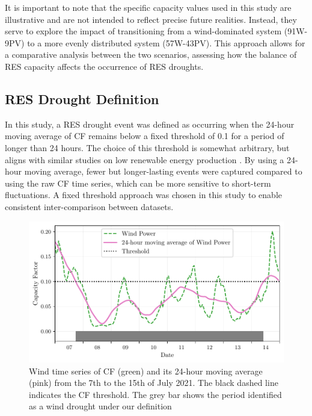 \documentclass[a4paper, 11p1t]{article}
\begin{document}
It is important to note that the specific capacity values used in this study are illustrative and are not intended to reflect precise future realities. Instead, they serve to explore the impact of transitioning from a wind-dominated system (91W-9PV) to a more evenly distributed system (57W-43PV). This approach allows for a comparative analysis between the two scenarios, assessing how the balance of RES capacity affects the occurrence of RES droughts.

\subsection{RES Drought Definition}
\label{sec:res_drought}

In this study, a RES drought event was defined as occurring when the 24-hour moving average of CF remains below a fixed threshold of 0.1 for a period of longer than 24 hours. The choice of this threshold is somewhat arbitrary, but aligns with similar studies on low renewable energy production \cite{kaspar2019drought, ohba2022drought, mayer2023drought}. By using a 24-hour moving average, fewer but longer-lasting events were captured compared to using the raw CF time series, which can be more sensitive to short-term fluctuations. A fixed threshold approach was chosen in this study to enable consistent inter-comparison between datasets.

\begin{figure}[ht!]
	\centering
	\includegraphics{droughts_methodology.pdf}
	\caption{Wind time series of CF (green) and its 24-hour moving average (pink) from the 7th to the 15th of July 2021. The black dashed line indicates the CF threshold. The grey bar shows the period identified as a wind drought under our definition}
	\label{fig:find_res_droughts}
\end{figure}
\end{document}

